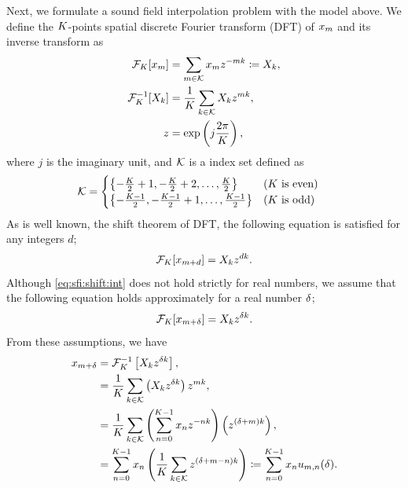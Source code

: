 \documentclass[sip,biber]{now-journal}
\newcommand{\todo}[1]{\textcolor{red}{#1}}
\begin{document}
Next, we formulate a sound field interpolation problem with the model above.
We define the $K$-points spatial discrete Fourier transform (DFT) of $x _{m}$ and its inverse transform as
\begin{align}
  \mathcal{F} _{K} [x _{m}] &= \sum _{m \in \mathcal{K}} x _{m} z ^{-mk} \coloneqq X _{k},\\
  \mathcal{F} _{K} ^{-1} [X _{k}] &= \frac{1}{K} \sum _{k \in \mathcal{K}} X _{k} z ^{mk}, \\
  z &= \exp \left(j\frac{2\pi}{K}\right),
\end{align}
where $j$ is the imaginary unit,
and $\mathcal{K}$ is a index set defined as%
\begin{align}
  \mathcal{K} &=
  \begin{cases}
    \left\{-\frac{K}{2} + 1, -\frac{K}{2} + 2, \dots, \frac{K}{2}\right\} & \text{($K$ is even)} \\
    \left\{-\frac{K - 1}{2}, -\frac{K - 1}{2} + 1, \dots, \frac{K - 1}{2}\right\} & \text{($K$ is odd)}
  \end{cases}
\end{align}
As is well known, the shift theorem of DFT, the following equation is satisfied for any integers $d$;
\begin{equation}
  \dft _{\Src} [\sfcma _{\mic + d}] = \Sfcma _{\src} \twid ^{d \src}.%
  \label{eq:sfi:shift:int}
\end{equation}
Although \eqref{eq:sfi:shift:int} does not hold strictly for real numbers, we assume that the following equation holds approximately for a real number $\delta$;
\begin{equation}
  \dft _{\Src} [\sfcma _{\mic + \rotSmpl}] = \Sfcma _{\src} \twid ^{\rotSmpl \src}.%
  \label{eq:sfi:shift:dft}
\end{equation}
From these assumptions, we have
\begin{align}
  x _{m + \delta} &= \mathcal{F} _{K} ^{-1} \left[X _{k} z ^{\delta k}\right], \\
                            &= \frac{1}{K} \sum _{k \in \mathcal{K}} \left(X _{k}z ^{\delta k} \right) z ^{mk}, \\
                            &= \frac{1}{K} \sum _{k \in \mathcal{K}} \left(\sum _{n=0} ^{K - 1} x _{n} z ^{-nk}\right) \left( z ^{(\delta + m)k} \right), \\
                            &= \sum _{n = 0} ^{K - 1} x _{n} \left( \frac{1}{K} \sum _{k \in \mathcal{K}} z ^{(\delta + m - n)k} \right)
                            \coloneqq \sum _{n = 0} ^{K - 1} x _{n} u _{m, n}(\delta) \label{eq:sfi:elem}.
\end{align}
\end{document}
